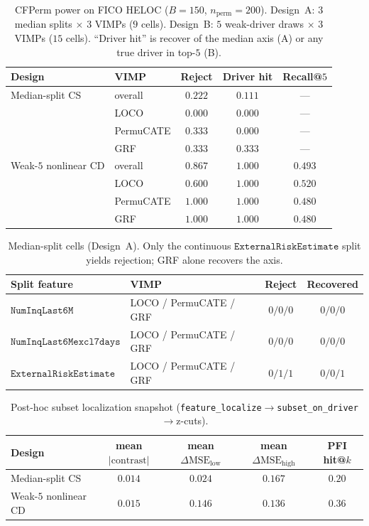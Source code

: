 \begin{table}[t]
\centering
\caption{CFPerm power on FICO HELOC ($B=150$, $n_{\mathrm{perm}}=200$).
Design~A: $3$ median splits $\times$ $3$ VIMPs ($9$ cells).
Design~B: $5$ weak-driver draws $\times$ $3$ VIMPs ($15$ cells).
``Driver hit'' is recover of the median axis (A) or any true driver in top-$5$ (B).}
\label{tab:fico-cfperm-power}
\begin{tabular}{llccc}
\toprule
Design & VIMP & Reject & Driver hit & Recall@$5$ \\
\midrule
Median-split CS & overall & $0.222$ & $0.111$ & --- \\
 & LOCO & $0.000$ & $0.000$ & --- \\
 & PermuCATE & $0.333$ & $0.000$ & --- \\
 & GRF & $0.333$ & $0.333$ & --- \\
\midrule
Weak-$5$ nonlinear CD & overall & $0.867$ & $1.000$ & $0.493$ \\
 & LOCO & $0.600$ & $1.000$ & $0.520$ \\
 & PermuCATE & $1.000$ & $1.000$ & $0.480$ \\
 & GRF & $1.000$ & $1.000$ & $0.480$ \\
\bottomrule
\end{tabular}
\end{table}

\begin{table}[t]
\centering
\caption{Median-split cells (Design~A). Only the continuous
$\mathtt{ExternalRiskEstimate}$ split yields rejection; GRF alone recovers the axis.}
\label{tab:fico-median-cells}
\begin{tabular}{llcc}
\toprule
Split feature & VIMP & Reject & Recovered \\
\midrule
$\mathtt{NumInqLast6M}$ & LOCO / PermuCATE / GRF & $0/0/0$ & $0/0/0$ \\
$\mathtt{NumInqLast6Mexcl7days}$ & LOCO / PermuCATE / GRF & $0/0/0$ & $0/0/0$ \\
$\mathtt{ExternalRiskEstimate}$ & LOCO / PermuCATE / GRF & $0/1/1$ & $0/0/1$ \\
\bottomrule
\end{tabular}
\end{table}

\begin{table}[t]
\centering
\caption{Post-hoc subset localization snapshot
(\texttt{feature\_localize}$\to$\texttt{subset\_on\_driver}$\to$z-cuts).}
\label{tab:fico-subset}
\begin{tabular}{lcccc}
\toprule
Design & mean $|\mathrm{contrast}|$ & mean $\Delta\mathrm{MSE}_{\mathrm{low}}$ & mean $\Delta\mathrm{MSE}_{\mathrm{high}}$ & PFI hit@$k$ \\
\midrule
Median-split CS & $0.014$ & $0.024$ & $0.167$ & $0.20$ \\
Weak-$5$ nonlinear CD & $0.015$ & $0.146$ & $0.136$ & $0.36$ \\
\bottomrule
\end{tabular}
\end{table}

